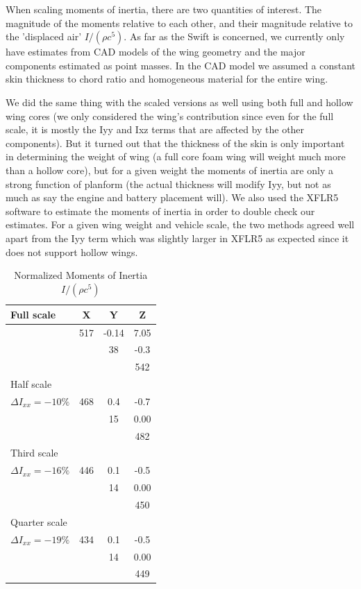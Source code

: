 \documentclass[titlepage,10pt]{article}
\begin{document}
When scaling moments of inertia, there are two quantities of interest. The magnitude of the moments relative to each other, and their magnitude relative to the 'displaced air' $I/(\rho c^5)$. As far as the Swift is concerned,  we currently only have estimates from CAD models of the wing geometry and the major components estimated as point masses. In the CAD model we assumed a constant skin thickness to chord ratio and homogeneous material for the entire wing.\\
\newpage

We did the same thing with the scaled versions as well using both full and hollow wing cores (we only considered the wing's contribution since even for the full scale, it is mostly the Iyy and Ixz terms that are affected by the other components). But it turned out that the thickness of the skin is only important in determining the weight of wing (a full core foam wing will weight much more than a hollow core), but for a given weight the moments of inertia are only a strong function of planform (the actual thickness will modify Iyy, but not as much as say the engine and battery placement will). We also used the XFLR5 software to estimate the moments of inertia in order to double check our estimates. For a given wing weight and vehicle scale, the two methods agreed well apart from the Iyy term which was slightly larger in XFLR5 as expected since it does not support hollow wings.\\
		
\begin{table}[h]
\begin{center}
\begin{tabular}{|l|c c c|}
\hline
Full scale & X & Y & Z \\
\hline
 & 517     &-0.14	&7.05 \\
 &	&38	&-0.3 \\
 &	&	&542 \\
\hline
Half scale & & &\\
\hline		
 $\Delta I_{xx} = -10\%$  & 468	&0.4	&-0.7 \\
 &	&15	&0.00 \\
 &	&	&482 \\
\hline
Third scale & & &\\
\hline		
 $\Delta I_{xx} = -16\%$  & 446	&0.1	&-0.5 \\
 &	&14	&0.00 \\
 &	&	&450 \\
\hline
Quarter scale & & & \\
\hline		
 $\Delta I_{xx} = -19\%$ & 434	&0.1	&-0.5 \\
 &	&14	&0.00 \\
 &	& 	&449 \\
\hline
\end{tabular}
\caption{Normalized Moments of Inertia $I/(\rho c^5)$}
\label{tab:inertia}
\end{center}
\end{table}
\end{document}
